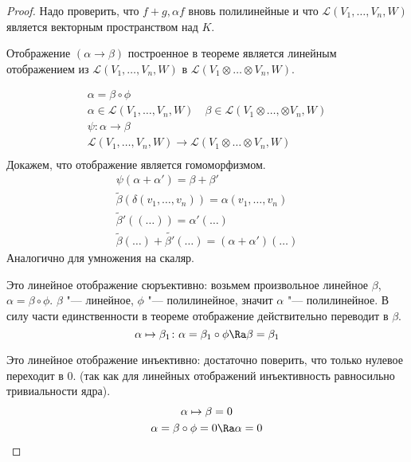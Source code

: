 \begin{description}
\begin{proof}
	Надо проверить, что $f+g, \alpha f$ вновь полилинейные и
	что $\mathcal L(V_1, \dots, V_n, W)$ является векторным пространством над $K$.
	
	
	Отображение $(\alpha \to \beta)$ построенное в теореме является линейным отображением из
	$\mathcal L(V_1, \dots, V_n, W)$  в $\mathcal L(V_1 \otimes \dots \otimes V_n, W)$.

	\begin{gather*}
		\alpha = \beta \circ \phi \\
		\alpha \in \mathcal L(V_1, \dots, V_n, W) \quad
		\beta \in \mathcal L(V_1 \otimes \dots,\otimes V_n, W) \\
		\psi \colon \alpha \to \beta \\
		\mathcal L(V_1, \dots, V_n, W) \to \mathcal L(V_1 \otimes \dots \otimes V_n, W) \\
       \end{gather*}
       Докажем, что отображение является гомоморфизмом. 
       \begin{gather*}	
		\psi(\alpha + \alpha') = \beta + \beta' \\
		\tilde \beta(\delta(v_1, \dots, v_n)) = \alpha(v_1, \dots, v_n) \\
		\tilde \beta'((\dots)) = \alpha'(\dots) \\
		\tilde \beta(\dots) + \tilde{\beta'}(\dots) = (\alpha + \alpha')(\dots)
	\end{gather*}
	Аналогично для умножения на скаляр.

	Это линейное отображение сюръективно:
	возьмем произвольное линейное $\beta$, $\alpha = \beta \circ \phi$.
	$\beta$ "--- линейное, $\phi$ "--- полилинейное, значит $\alpha$ "--- полилинейное.
	В силу части единственности в теореме отображение действительно переводит в $\beta$.
	\[ \alpha \mapsto \beta_1 \colon \alpha = \beta_1 \circ \phi \Ra \beta = \beta_1 \]

	Это линейное отображение инъективно:
	достаточно поверить, что только нулевое переходит в 0.
	(так как для линейных отображений инъективность равносильно тривиальности ядра).
	\begin{gather*}
		\alpha \mapsto \beta = 0 \\
		\alpha = \beta \circ \phi = 0 \Ra \alpha = 0
	\end{gather*}
	\end{proof}
\end{description}

